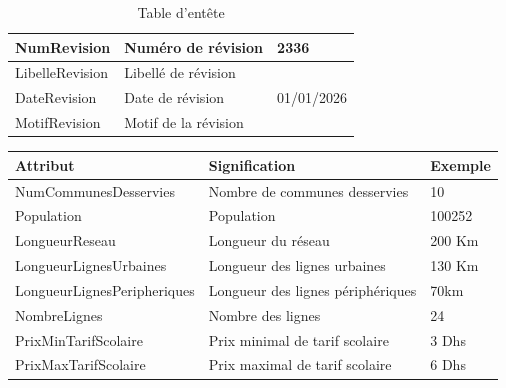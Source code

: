 \documentclass[a4paper]{report}
\begin{document}
\begin{doublespace}
\begin{table}[H]
\begin{center}
\begin{tabularx}{17.5cm}{|p{3.5cm}|X|p{3.5cm}|}
				\hline
				NumRevision          & Numéro de révision                                            & 2336                \\
				\hline
				LibelleRevision      & Libellé de révision                                           &                     \\
				\hline
				DateRevision         & Date de révision                                              & 01/01/2026          \\
				\hline
				MotifRevision        & Motif de la révision                                          &                     \\
				\hline
			\end{tabularx}
			\caption{Table d'entête}
		\end{center}
	\end{table}
	\begin{table}[H]
		\begin{center}
			\begin{tabularx}{17.5cm}{|p{6.5cm}|X|p{2.1cm}|}
				\hline
				\textbf{Attribut}                    & \textbf{Signification}                                       & \textbf{Exemple} \\
				\hline
				NumCommunesDesservies                & Nombre de communes desservies                                & 10               \\
				\hline
				Population                           & Population                                                   & 100252           \\
				\hline
				LongueurReseau                       & Longueur du réseau                                           & 200 Km           \\
				\hline
				LongueurLignesUrbaines               & Longueur des lignes urbaines                                 & 130 Km           \\
				\hline
				LongueurLignesPeripheriques          & Longueur des lignes périphériques                            & 70km             \\
				\hline
				NombreLignes                         & Nombre des lignes                                            & 24               \\
				\hline
				PrixMinTarifScolaire                 & Prix minimal de tarif scolaire                               & 3 Dhs            \\
				\hline
				PrixMaxTarifScolaire                 & Prix maximal de tarif scolaire                               & 6 Dhs            \\

\end{tabularx}
\end{center}
\end{table}
\end{doublespace}
\end{document}
